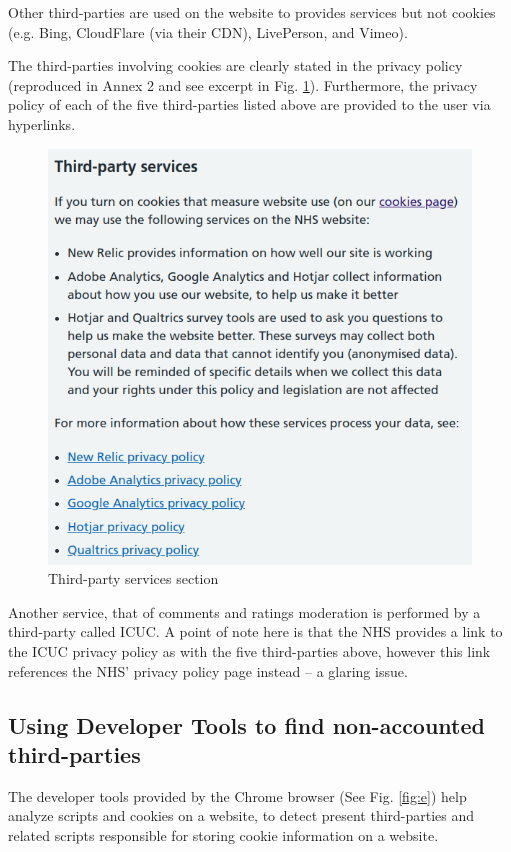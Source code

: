 \documentclass[twocolumn, letterpaper,13pt]{scrartcl}
\begin{document}
        Other third-parties are used on the website to provides services but not cookies (e.g. Bing, CloudFlare (via their CDN), LivePerson, and Vimeo).
        
        The third-parties involving cookies are clearly stated in the privacy policy (reproduced in Annex 2 and see excerpt in Fig. \ref{fig:d}). Furthermore, the privacy policy of each of the five third-parties listed above are provided to the user via hyperlinks.

	\begin{figure} \includegraphics[width=0.98\linewidth]{third_parties.png}
    \caption{Third-party services section\label{fig:d}}
    \end{figure}
    
    Another service, that of comments and ratings moderation is performed by a third-party called ICUC. A point of note here is that the NHS provides a link to the ICUC privacy policy as with the five third-parties above, however this link references the NHS' privacy policy page instead -- a glaring issue.
    
    \subsection*{Using Developer Tools to find non-accounted third-parties}
    
    The developer tools provided by the Chrome browser (See Fig. \ref{fig:e}) help analyze scripts and cookies on a website, to detect present third-parties and related scripts responsible for storing cookie information on a website. 
    
\end{document}
